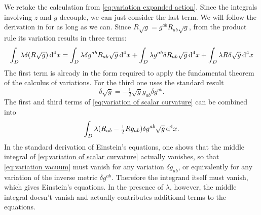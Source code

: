 \documentclass[../main.tex]{subfiles}
\begin{document}
We retake the calculation from \cref{eq:variation expanded action}. Since the integrals
involving \( z \) and \( g \) decouple, we can just consider the last term. We will follow the
derivation in \cite{Carroll1997} for as long as we can. Since \( R\sqrt{g} =
g^{ab}R_{ab}\sqrt{g} \), from the product rule its variation results in three terms:
\begin{equation}\label{eq:variation of scalar curvature}
	\int_D \lambda \delta(R \sqrt{g}) \,\mathrm{d}^4 x = \int_D \lambda \delta g^{ab} R_{ab} \sqrt{g}
	\,\mathrm{d}^4 x + \int_D \lambda g^{ab} \delta R_{ab} \sqrt{g} \,\mathrm{d}^4 x + \int_{D} \lambda R
	\delta\sqrt{g} \,\mathrm{d}^4 x
\end{equation}
The first term is already in the form required to apply the fundamental theorem of the
calculus of variations. For the third one uses the standard result
\begin{equation*}
	\delta \sqrt{g} = -\tfrac{1}{2}\sqrt{g} g_{ab} \delta g^{ab}.
\end{equation*}
The first and third terms of \cref{eq:variation of scalar curvature} can be combined into
\begin{equation}\label{eq:variation vacuum}
	\int_D \lambda (R_{ab} - \tfrac{1}{2} Rg_{ab}) \delta g^{ab} \sqrt{g} \,\mathrm{d}^4 x.
\end{equation}
In the standard derivation of Einstein's equations, one shows that the middle integral of
\cref{eq:variation of scalar curvature} actually vanishes, so that \cref{eq:variation
vacuum} must vanish for any variation \( \delta g_{ab} \), or equivalently for any
variation of the inverse metric \( \delta g^{ab} \). Therefore the integrand itself must
vanish, which gives Einstein's equations. In the presence of \( \lambda \), however, the
middle integral doesn't vanish and actually contributes additional terms to the
equations.
\end{document}
